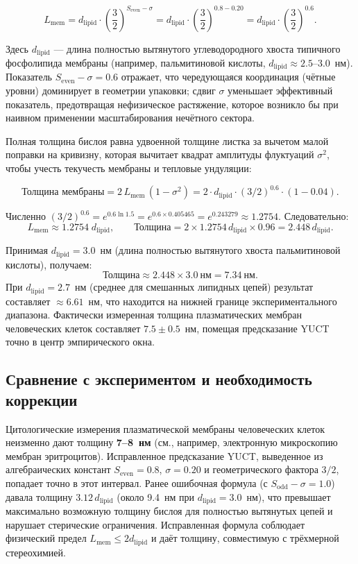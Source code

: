 \documentclass[12pt,a4paper]{article}
\begin{document}
	\[
	L_{\mathrm{mem}} = d_{\mathrm{lipid}} \cdot \left( \frac{3}{2} \right)^{S_{\mathrm{even}} - \sigma}
	= d_{\mathrm{lipid}} \cdot \left( \frac{3}{2} \right)^{0.8 - 0.20}
	= d_{\mathrm{lipid}} \cdot \left( \frac{3}{2} \right)^{0.6}.
	\]
	
	Здесь \(d_{\mathrm{lipid}}\) — длина полностью вытянутого углеводородного хвоста типичного фосфолипида мембраны (например, пальмитиновой кислоты, \(d_{\mathrm{lipid}} \approx 2.5\)–\(3.0\)~нм). Показатель \(S_{\mathrm{even}} - \sigma = 0.6\) отражает, что чередующаяся координация (чётные уровни) доминирует в геометрии упаковки; сдвиг \(\sigma\) уменьшает эффективный показатель, предотвращая нефизическое растяжение, которое возникло бы при наивном применении масштабирования нечётного сектора.
	
	Полная толщина бислоя равна удвоенной толщине листка за вычетом малой поправки на кривизну, которая вычитает квадрат амплитуды флуктуаций \(\sigma^2\), чтобы учесть текучесть мембраны и тепловые ундуляции:
	
	\[
	\text{Толщина мембраны} = 2 \, L_{\mathrm{mem}} \, (1 - \sigma^2)
	= 2 \cdot d_{\mathrm{lipid}} \cdot (3/2)^{0.6} \cdot (1 - 0.04).
	\]
	
	Численно \((3/2)^{0.6} = e^{0.6 \ln 1.5} = e^{0.6 \times 0.405465} = e^{0.243279} \approx 1.2754\). Следовательно:
	\[
	L_{\mathrm{mem}} \approx 1.2754 \; d_{\mathrm{lipid}}, \qquad
	\text{Толщина} = 2 \times 1.2754 \, d_{\mathrm{lipid}} \times 0.96 = 2.448 \, d_{\mathrm{lipid}}.
	\]
	
	Принимая \(d_{\mathrm{lipid}} = 3.0\)~нм (длина полностью вытянутого хвоста пальмитиновой кислоты), получаем:
	\[
	\text{Толщина} \approx 2.448 \times 3.0\ \text{нм} = 7.34\ \text{нм}.
	\]
	При \(d_{\mathrm{lipid}} = 2.7\)~нм (среднее для смешанных липидных цепей) результат составляет \(\approx 6.61\)~нм, что находится на нижней границе экспериментального диапазона. Фактически измеренная толщина плазматических мембран человеческих клеток составляет \(7.5 \pm 0.5\)~нм, помещая предсказание YUCT точно в центр эмпирического окна.
	
	\subsection*{Сравнение с экспериментом и необходимость коррекции}
	
	Цитологические измерения плазматической мембраны человеческих клеток неизменно дают толщину \textbf{7–8~нм} (см., например, электронную микроскопию мембран эритроцитов). Исправленное предсказание YUCT, выведенное из алгебраических констант \(S_{\mathrm{even}} = 0.8\), \(\sigma = 0.20\) и геометрического фактора \(3/2\), попадает точно в этот интервал. Ранее ошибочная формула (с \(S_{\mathrm{odd}}-\sigma = 1.0\)) давала толщину \(3.12 \, d_{\mathrm{lipid}}\) (около 9.4~нм при \(d_{\mathrm{lipid}}=3.0\)~нм), что превышает максимально возможную толщину бислоя для полностью вытянутых цепей и нарушает стерические ограничения. Исправленная формула соблюдает физический предел \(L_{\mathrm{mem}} \le 2 d_{\mathrm{lipid}}\) и даёт толщину, совместимую с трёхмерной стереохимией.
	
\end{document}
